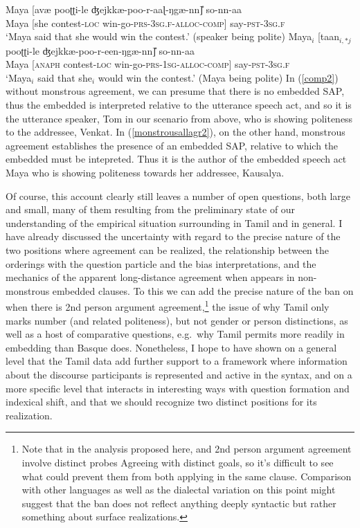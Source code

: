 \documentclass[output=paper, modfonts, nonflat]{langsci/langscibook}
\begin{document}
\ea\label{monnomon}
 \ea\label{comp2}
 \gll Maya [avæ{} pooʈʈi-le ʤejkkæ-poo-r-aaɭ-ŋgæ-nn\U] so-nn-aa\\  
 Maya [she contest-\textsc{loc}{} win-go-\textsc{prs}-3\textsc{sg.f}-\textsc{alloc}-\textsc{comp}] say-\textsc{pst}-3\textsc{sg.f}\\ 
 \glt `Maya said that she would win the contest.' (speaker being polite)
 \ex\label{monstrousallagr2}\gll Maya$_i$ [taan$_{i,*j}$ pooʈʈi-le ʤejkkæ-poo-r-een-ŋgæ-nn\U] so-nn-aa\\  
 Maya [\textsc{anaph} contest-\textsc{loc}{} win-go-\textsc{prs}-1\textsc{sg}-\textsc{alloc}-\textsc{comp}] say-\textsc{pst}-3\textsc{sg.f}\\
 \glt `Maya$_i$ said that she$_i$ would win the contest.' (Maya being polite)
 \z
\z
%
In (\ref{comp2}) without monstrous agreement, we can presume that
there is no embedded SAP, thus the embedded \allagr{} is interpreted
relative to the utterance speech act, and so it is the utterance
speaker, Tom in our scenario from above, who is showing politeness to
the addressee, Venkat. In (\ref{monstrousallagr2}), on the other hand,
monstrous agreement establishes the presence of an embedded SAP,
relative to which the embedded \allagr{} must be intepreted. Thus it
is the author of the embedded speech act Maya who is showing
politeness towards her addressee, Kausalya.

Of course, this account clearly still leaves a number of open
questions, both large and small, many of them resulting from the
preliminary state of our understanding of the empirical situation
surrounding \allagr{} in Tamil and in general. I have already
discussed the uncertainty with regard to the precise nature of the two
positions where agreement can be realized, the relationship between
the orderings with the question particle and the bias interpretations,
and the mechanics of the apparent long-distance agreement when
\allagr{} appears in non-monstrous embedded clauses. To this we can
add the precise nature of the ban on \allagr{} when there is 2nd
person argument agreement,\footnote{Note that in the analysis proposed
  here, \allagr{} and 2nd person argument agreement involve distinct
  probes Agreeing with distinct goals, so it's difficult to see what
  could prevent them from both applying in the same clause. Comparison
  with other languages as well as the dialectal variation on this
  point might suggest that the ban does not reflect anything deeply
  syntactic but rather something about surface realizations.} the
issue of why Tamil \allagr{} only marks number (and related
politeness), but not gender or person distinctions, as well as a host
of comparative questions, e.g.\ why Tamil permits \allagr{} more
readily in embedding than Basque does. Nonetheless, I hope to have
shown on a general level that the Tamil data add further support to a
framework where information about the discourse participants is
represented and active in the syntax, and on a more specific level
that \allagr{} interacts in interesting ways with question formation
and indexical shift, and that we should recognize two distinct
positions for its realization.
\end{document}
